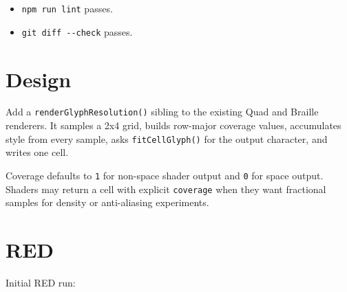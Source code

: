 \begin{itemize}
\item
  \texttt{n\allowbreak{}p\allowbreak{}m\allowbreak{} \allowbreak{}r\allowbreak{}u\allowbreak{}n\allowbreak{} \allowbreak{}l\allowbreak{}i\allowbreak{}n\allowbreak{}t} passes.
\item
  \texttt{g\allowbreak{}i\allowbreak{}t\allowbreak{} \allowbreak{}d\allowbreak{}i\allowbreak{}f\allowbreak{}f\allowbreak{} \allowbreak{}-\allowbreak{}-\allowbreak{}c\allowbreak{}h\allowbreak{}e\allowbreak{}c\allowbreak{}k} passes.
\end{itemize}

\section{Design}\label{record-162-design}

Add a \texttt{r\allowbreak{}e\allowbreak{}n\allowbreak{}d\allowbreak{}e\allowbreak{}r\allowbreak{}G\allowbreak{}l\allowbreak{}y\allowbreak{}p\allowbreak{}h\allowbreak{}R\allowbreak{}e\allowbreak{}s\allowbreak{}o\allowbreak{}l\allowbreak{}u\allowbreak{}t\allowbreak{}i\allowbreak{}o\allowbreak{}n\allowbreak{}(\allowbreak{})} sibling to the existing Quad and Braille renderers. It samples a 2x4 grid, builds row-major coverage values, accumulates style from every sample, asks \texttt{f\allowbreak{}i\allowbreak{}t\allowbreak{}C\allowbreak{}e\allowbreak{}l\allowbreak{}l\allowbreak{}G\allowbreak{}l\allowbreak{}y\allowbreak{}p\allowbreak{}h\allowbreak{}(\allowbreak{})} for the output character, and writes one cell.

Coverage defaults to \texttt{1} for non-space shader output and \texttt{0} for space output. Shaders may return a cell with explicit \texttt{c\allowbreak{}o\allowbreak{}v\allowbreak{}e\allowbreak{}r\allowbreak{}a\allowbreak{}g\allowbreak{}e} when they want fractional samples for density or anti-aliasing experiments.

\section{RED}\label{record-162-red}

Initial RED run:

